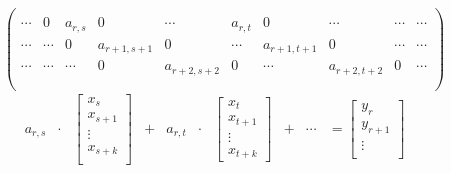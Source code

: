       \begin{figure}[ht]
        \centering
        $$
        \begin{pmatrix}
          \\
          \cdots & 0 & a_{r,s} &  0 & \cdots & a_{r,t} & 0 & \cdots & \cdots & \cdots \\
          \cdots & \cdots & 0 & a_{r+1,s+1} & 0 & \cdots & a_{r+1,t+1} & 0 & \cdots & \cdots \\
          \cdots & \cdots & \cdots & 0 & a_{r+2,s+2} & 0 & \cdots & a_{r+2,t+2} & 0 & \cdots \\
          \\
        \end{pmatrix}
        $$
        $$
        \begin{matrix}
          a_{r,s} & \cdot & \begin{bmatrix}
                                    x_s      \\
                                    x_{s+1}  \\
                                      \vdots \\
                                    x_{s+k}  \\
          \end{bmatrix} & + & a_{r,t} & \cdot & \begin{bmatrix}
                                                x_t \\
                                                x_{t+1} \\
                                                \vdots \\
                                                x_{t+k}
                                                                              \end{bmatrix} & + & \cdots & =  \begin{bmatrix}
                                                                                                                 y_{r} \\
                                                                                                                 y_{r+1} \\
                                                                                                                 \vdots \\

\end{bmatrix}
\end{matrix}$$
\end{figure}

